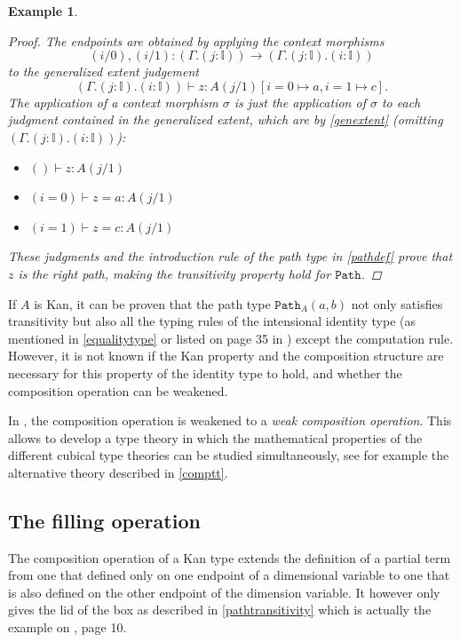 \documentclass[12pt,a4paper,twoside,xetex]{book} %
\newcommand{\keyword}[1]{\emph{#1}\index{#1}}
\newtheorem{example}[theorem]{Example}
\newcommand{\op}[1]{\mathtt{#1}}
\begin{document}
\begin{example}
\begin{proof}
The endpoints are obtained by applying the context morphisms $$(i/0),(i/1): 
(\Gamma . ( j : \mathbb{I})) \rightarrow (\Gamma. ( j : \mathbb{I}) . ( i :  
\mathbb{I}))$$ to the generalized extent judgement $$(\Gamma. ( j : \mathbb{I}) 
. ( i :  \mathbb{I})) \vdash z : A(j/1) [i =0 \mapsto a, i=1 \mapsto c].$$ The 
application of a context morphism $\sigma$  is just the application of $\sigma$ 
to each judgment contained in the generalized extent, which are by \cref{genextent}
(omitting $(\Gamma. ( j : \mathbb{I}) . ( i :  \mathbb{I}))$):

\begin{itemize}
\item $ () \vdash z: A(j/1)$
\item $ (i = 0) \vdash z = a : A(j/1)$
\item $ (i = 1) \vdash z = c : A(j/1)$
\end{itemize}

These judgments and the introduction rule of the path type in \cref{pathdef} prove that $z$ is the right path, making the transitivity 
property hold for $\op{Path}$. 

\end{proof} 

\end{example}

If $A$ is Kan, it can be proven that the path type $\op{Path}_A(a,b)$ not only  
satisfies transitivity but also all the typing rules of  the intensional 
identity type (as mentioned in \cref{equalitytype} or listed on page 35 in 
\cite{Orton2019}) except the computation rule. However, it is not known if the Kan property and the composition structure are necessary for this property of the identity type to hold, and 
whether the composition operation can be weakened. 

In \cite{Cavallo2019}, the composition operation is weakened to a \keyword{weak composition operation}. This allows to develop a type theory 
in which the mathematical properties of the different cubical type theories can 
be studied simultaneously, see for example the alternative theory described in 
\cref{comptt}.


\subsection{The filling operation}\label{filling}

The composition operation of a Kan type extends the definition of a partial 
term from one that defined only on one  endpoint  of a dimensional variable to 
one that is also defined on the other endpoint of the dimension variable. It 
however only gives the lid of the box as described in 
\cref{pathtransitivity} which is actually the example  on \cite{Coquand2018}, 
page 10. 
\end{document}
